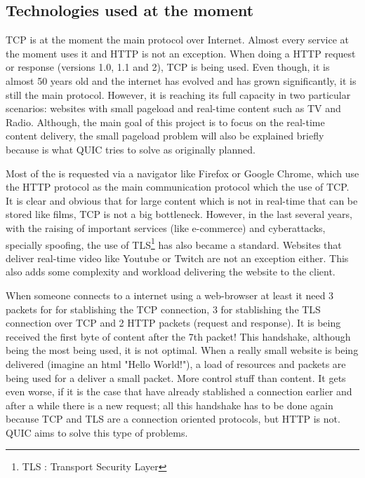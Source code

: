 \subsection{Technologies used at the moment}
{
    TCP is at the moment the main protocol over Internet. Almost every service at the moment uses it and HTTP is not an exception. When doing a HTTP request or response (versions 1.0,
    1.1 and 2), TCP is being used. Even though, it is almost 50 years old and the internet has evolved and has grown significantly, it is still the main protocol. However, it is reaching
    its full capacity in two particular scenarios: websites with small pageload and real-time content such as TV and Radio. Although, the main goal of this project is to focus on the 
    real-time content delivery, the small pageload problem will also be explained briefly because is what QUIC tries to solve as originally planned.    
    
    Most of the is requested via a navigator like Firefox or Google Chrome, which use the HTTP protocol as the main communication protocol which the use of TCP. It is clear and obvious
    that for large content which is not in real-time that can be stored like films, TCP is not a big bottleneck. However, in the last several years, with the
    raising of important services (like e-commerce) and cyberattacks, specially spoofing, the use of TLS\footnote{TLS : Transport Security Layer} has also became a standard. Websites that
    deliver real-time video like Youtube or Twitch are not an exception either. This also adds some complexity and workload delivering the website to the client.

    When someone connects to a internet using a web-browser at least it need 3 packets for for stablishing the TCP connection, 3 for stablishing the TLS connection over TCP and 2 HTTP packets (request and response).
    It is being received the first byte of content after the 7th packet! This handshake, although being the most being used, it is not optimal. When a really small website is being delivered (imagine an html "Hello World!"),
    a load of resources and packets are being used for a deliver a small packet. More control stuff than content. It gets even worse, if it is the case that have already stablished a connection earlier and after a while there
    is a new request; all this handshake has to be done again because TCP and TLS are a connection oriented protocols, but HTTP is not. QUIC aims to solve this type of problems.
}
